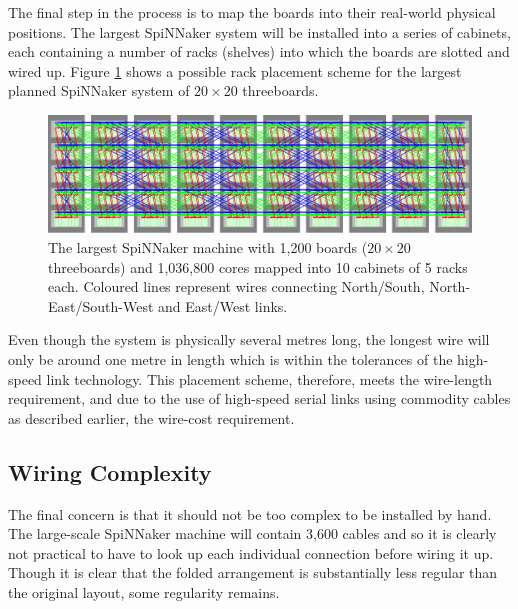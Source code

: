 			\label{sec:mapping-spinnaker-to-cabinets}
			
			The final step in the process is to map the boards into their real-world
			physical positions. The largest SpiNNaker system will be installed into a
			series of cabinets, each containing a number of racks (shelves) into which
			the boards are slotted and wired up. Figure \ref{fig:spinnaker106} shows a
			possible rack placement scheme for the largest planned SpiNNaker system of
			$20\times20$ threeboards.
			
			\begin{figure}
				\center
				\includegraphics[width=\textwidth]{figures/spinnaker106}
				\caption[SpiNNaker machine mapped into cabinets and racks.]{The largest
				SpiNNaker machine with 1,200 boards ($20\times20$ threeboards) and
				1,036,800 cores mapped into 10 cabinets of 5 racks each.  Coloured lines
				represent wires connecting {\color{red}North/South},
				{\color{green}North-East/South-West} and {\color{blue}East/West} links.}
				\label{fig:spinnaker106}
			\end{figure}
			
			Even though the system is physically several metres long, the longest wire
			will only be around one metre in length which is within the tolerances of
			the high-speed link technology. This placement scheme, therefore, meets
			the wire-length requirement, and due to the use of high-speed serial links
			using commodity cables as described earlier, the wire-cost requirement.
			
		\subsection{Wiring Complexity}
			
			The final concern is that it should not be too complex to
			be installed by hand. The large-scale SpiNNaker machine will contain 3,600
			cables and so it is clearly not practical to have to look up each
			individual connection before wiring it up. Though it is clear that the
			folded arrangement is substantially less regular than the original layout,
			some regularity remains.
			
